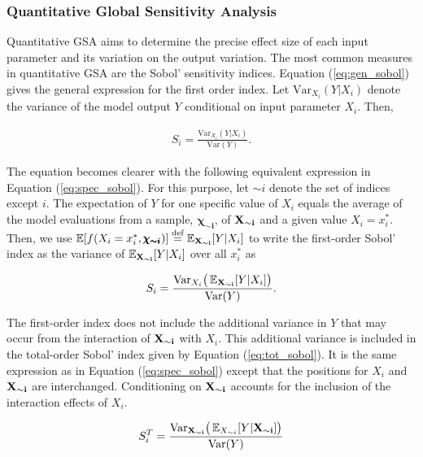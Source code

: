 \subsubsection{Quantitative Global Sensitivity Analysis}

Quantitative GSA aims to determine the precise effect size of each input parameter and its variation on the output variation. The most common measures in quantitative GSA are the Sobol' sensitivity indices. Equation (\ref{eq:gen_sobol}) gives the general expression for the first order index. Let $\text{Var}_{X_i} (Y|X_i)$ denote the variance of the model output $Y$ conditional on input parameter $X_i$. Then,

\begin{align} \label{eq:gen_sobol}
S_i = \frac{\text{Var}_{X_i}(Y|X_i)}{\text{Var}(Y)}.
\end{align}

\noindent
The equation becomes clearer with the following equivalent expression in Equation (\ref{eq:spec_sobol}).
For this purpose, let $\sim i$ denote the set of indices except $i$. The expectation of $Y$ for one specific value of $X_i$ equals the average of the model evaluations from a sample, $\pmb{\chi_{\sim i}}$,  of $\bold{X_{\sim i}}$ and a given value
$X_i = x_i^*$. Then, we use $\operatorname*{\mathbb{E}}[f(X_i = x_i^*,\pmb{\chi_{\sim i}} )] \stackrel{\text{def}}{=} \operatorname*{\mathbb{E}}_{\bold{X_{\sim i}}} [Y|X_i ]$ to write the first-order Sobol' index as the variance of $\operatorname*{\mathbb{E}}_{\bold{X_{\sim i}}} [Y|X_i ]$ over all $x_i^*$ as


\begin{align} \label{eq:spec_sobol}
S_i = \frac{\text{Var}_{X_i}\big( \operatorname*{\mathbb{E}}_{\bold{X_{\sim i}}} [Y|X_i ]\big)}{\text{Var}(Y)}.
\end{align}


\noindent
The first-order index does not include the additional variance in $Y$ that may occur from the interaction of $\bold{X_{\sim i}}$ with $X_i$. This additional variance is included in the total-order Sobol' index given by Equation (\ref{eq:tot_sobol}). It is the same expression as in Equation (\ref{eq:spec_sobol}) except that the positions for $X_i$ and $\bold{X_{\sim i}}$ are interchanged. Conditioning on $\bold{X_{\sim i}}$ accounts for the inclusion of the interaction effects of $X_i$.


\begin{align} \label{eq:tot_sobol}
S_{i}^T = \frac{\text{Var}_{\bold{X_{\sim i}}}\big( \operatorname*{\mathbb{E}}_{X_{\sim i}}[Y|\bold{X_{\sim i}]} \big)}{\text{Var}(Y)}
\end{align}

